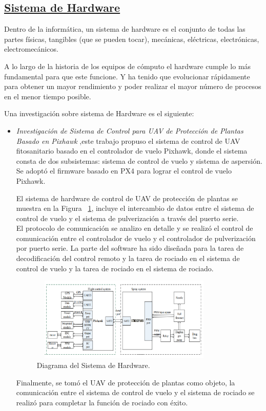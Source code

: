 \documentclass[10pt,journal]{IEEEtran}
\begin{document}
    \subsection{\underline{\textbf{Sistema de Hardware}}}
    Dentro de la informática, un sistema de hardware es el conjunto de todas las partes físicas, tangibles (que se pueden tocar), mecánicas, eléctricas, electrónicas, electromecánicos.

    A lo largo de la historia de los equipos de cómputo el hardware cumple lo más fundamental para que este funcione. Y ha tenido que evolucionar rápidamente para obtener un mayor rendimiento y poder realizar el mayor número de procesos en el menor tiempo posible.
    
    Una investigación sobre sistema de Hardware es el siguiente:
    \begin{itemize}
    \item  \textit{Investigación de Sistema de Control para UAV de Protección de Plantas Basado en Pixhawk} \citep{YANG2020371},este trabajo propuso el sistema de control de UAV fitosanitario basado en el controlador de vuelo Pixhawk, donde el sistema consta de dos subsistemas: sistema de control de vuelo y sistema de aspersión. Se  adoptó el firmware basado en PX4 para lograr el control de vuelo Pixhawk.
    
    El sistema de hardware de control de UAV de protección de plantas se muestra en la Figura ~\ref{f2}, incluye el intercambio de datos entre el sistema de control de vuelo y el sistema de pulverización a través del puerto serie. 
    \\ El protocolo de comunicación se analizo en detalle y se realizó el control de comunicación entre el controlador de vuelo y el controlador de pulverización por puerto serie. La parte del software ha sido diseñada para la tarea de decodificación del control remoto y la tarea de rociado en el sistema de control de vuelo y la tarea de rociado en el sistema de rociado.
    \begin{figure}[H]
        \begin{center}
        \includegraphics[width=9cm, height=4cm]{figuras/hardware.PNG}
        \caption{Diagrama del Sistema de Hardware.}
        \label{f2} 
        \end{center}
    \end{figure}
    
     Finalmente, se tomó el UAV de protección de plantas como objeto, la comunicación entre el sistema de control de vuelo y el sistema de rociado se realizó para completar la función de rociado con éxito.
    \end{itemize}
    
\end{document}
